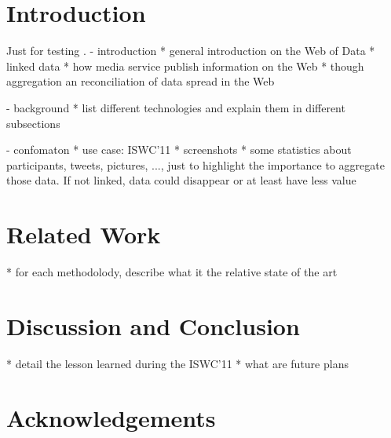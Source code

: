 \documentclass{llncs}
\begin{document}

\section{Introduction} \label{sec:introduction}
Just for testing \cite{confomaton}.
- introduction
* general introduction on the Web of Data
* linked data
* how media service publish information on the Web
* though aggregation an reconciliation of data spread in the Web

- background
* list different technologies and explain them in different subsections

- confomaton
* use case: ISWC'11
* screenshots
* some statistics about participants, tweets, pictures, ..., just to highlight the importance to aggregate those data. If not linked, data could disappear or at least have less value

\section{Related Work} \label{sec:relatedwork}
* for each methodolody, describe what it the relative state of the art

\section{Discussion and Conclusion} \label{sec:discussionconclusion}
* detail the lesson learned during the ISWC'11
* what are future plans


\section*{Acknowledgements} \label{sec:acknowledgements}

\renewcommand{\ttdefault}{cmvtt}
\renewcommand\UrlFont\tt



\end{document}

